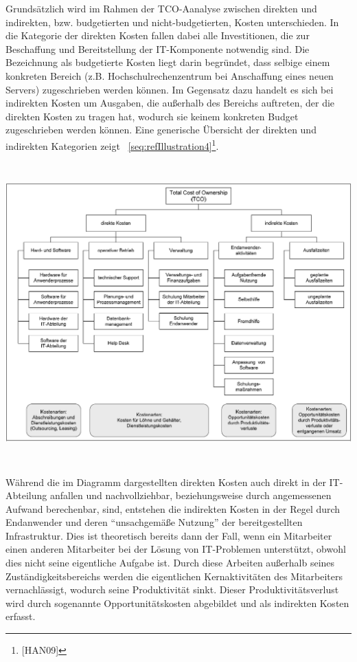 \documentclass[a4paper]{article}
\makeatletter
\newcommand\captionof[1]{\def\@captype{#1}\caption}
\makeatother
\begin{document}
\bigskip

{\sffamily
Grundsätzlich wird im Rahmen der TCO-Aanalyse zwischen direkten und indirekten, bzw. budgetierten und
nicht-budgetierten, Kosten unterschieden. In die Kategorie der direkten Kosten fallen dabei alle Investitionen, die zur
Beschaffung und Bereitstellung der IT-Komponente notwendig sind. Die Bezeichnung als budgetierte Kosten liegt darin
begründet, dass selbige einem konkreten Bereich (z.B. Hochschulrechenzentrum bei Anschaffung eines neuen Servers)
zugeschrieben werden können. Im Gegensatz dazu handelt es sich bei indirekten Kosten um Ausgaben, die außerhalb des
Bereichs auftreten, der die direkten Kosten zu tragen hat, wodurch sie keinem konkreten Budget zugeschrieben werden
können. Eine generische Übersicht der direkten und indirekten Kategorien zeigt
\figurename~\ref{seq:refIllustration4}\footnote{[HAN09]}.}


\bigskip

{\centering \includegraphics[width=15.45cm,height=11.555cm]{INMAusarbeitung02-img005.png}
\captionof{figure}[: \ generische Kostenkategorien {}-und Arten (Hanser 09)]{: \ generische Kostenkategorien -und Arten
\textcolor[rgb]{1.0,0.2,0.2}{(Hanser 09)}}
\label{seq:refIllustration4}
\par}
{\sffamily
Während die im Diagramm dargestellten direkten Kosten auch direkt in der IT-Abteilung anfallen und nachvollziehbar,
beziehungsweise durch angemessenen Aufwand berechenbar, sind, entstehen die indirekten Kosten in der Regel durch
Endanwender und deren “unsachgemäße Nutzung” der bereitgestellten Infrastruktur. Dies ist theoretisch bereits dann der
Fall, wenn ein Mitarbeiter einen anderen Mitarbeiter bei der Lösung von IT-Problemen unterstützt, obwohl dies nicht
seine eigentliche Aufgabe ist. Durch diese Arbeiten außerhalb seines Zuständigkeitsbereichs werden die eigentlichen
Kernaktivitäten des Mitarbeiters vernachlässigt, wodurch seine Produktivität sinkt. Dieser Produktivitätsverlust wird
durch sogenannte Opportunitätskosten abgebildet und als indirekten Kosten erfasst.}
\end{document}
